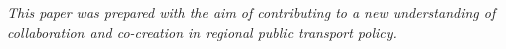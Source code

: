 \emph{This paper was prepared with the aim of contributing to a new
understanding of collaboration and co-creation in regional public
transport policy.}


\printbibliography[heading=subbibliography,title={章末参考文献}]
